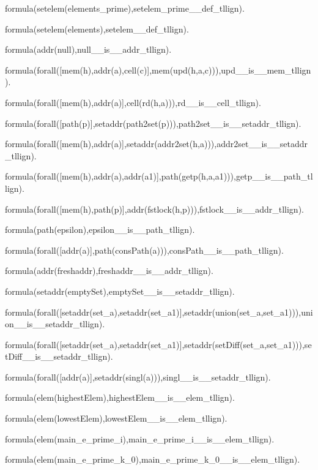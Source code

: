 formula(setelem(elements\_prime),setelem\_prime\_\_def\_tllign).

formula(setelem(elements),setelem\_\_def\_tllign).


formula(addr(null),null\_\_is\_\_addr\_tllign).

formula(forall([mem(h),addr(a),cell(c)],mem(upd(h,a,c))),upd\_\_is\_\_mem\_tllign).

formula(forall([mem(h),addr(a)],cell(rd(h,a))),rd\_\_is\_\_cell\_tllign).



formula(forall([path(p)],setaddr(path2set(p))),path2set\_\_is\_\_setaddr\_tllign).

formula(forall([mem(h),addr(a)],setaddr(addr2set(h,a))),addr2set\_\_is\_\_setaddr\_tllign).

formula(forall([mem(h),addr(a),addr(a1)],path(getp(h,a,a1))),getp\_\_is\_\_path\_tllign).

formula(forall([mem(h),path(p)],addr(fstlock(h,p))),fstlock\_\_is\_\_addr\_tllign).


formula(path(epsilon),epsilon\_\_is\_\_path\_tllign).

formula(forall([addr(a)],path(consPath(a))),consPath\_\_is\_\_path\_tllign).


formula(addr(freshaddr),freshaddr\_\_is\_\_addr\_tllign).


formula(setaddr(emptySet),emptySet\_\_is\_\_setaddr\_tllign).

formula(forall([setaddr(set\_a),setaddr(set\_a1)],setaddr(union(set\_a,set\_a1))),union\_\_is\_\_setaddr\_tllign).

formula(forall([setaddr(set\_a),setaddr(set\_a1)],setaddr(setDiff(set\_a,set\_a1))),setDiff\_\_is\_\_setaddr\_tllign).

formula(forall([addr(a)],setaddr(singl(a))),singl\_\_is\_\_setaddr\_tllign).


formula(elem(highestElem),highestElem\_\_is\_\_elem\_tllign).

formula(elem(lowestElem),lowestElem\_\_is\_\_elem\_tllign).

formula(elem(main\_e\_prime\_i),main\_e\_prime\_i\_\_is\_\_elem\_tllign).

formula(elem(main\_e\_prime\_k\_0),main\_e\_prime\_k\_0\_\_is\_\_elem\_tllign).

